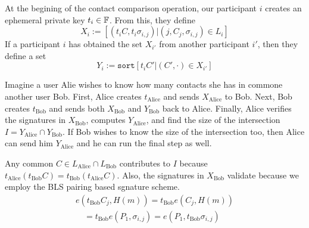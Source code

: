 \documentclass[twoside,letterpaper]{sig-alternate}
\def\mathperiod{.}
\def\mathperiod{}
\begin{document}
At the begining of the contact comparison operation,
our participant $i$ creates an ephemeral private key $t_i \in \mathbb{F}$.
From this, they define 
$$ X_i := %
  \left[ (t_i C, t_i \sigma_{i,j}) | (j,C_j,\sigma_{i,j}) \in L_i \right]
  \mathperiod $$ 
If a participant $i$ has obtained the set $X_{i'}$ from
 another participant $i'$, then they define a set 
$$ Y_i := \texttt{sort} \left[ t_i C' | (C',\cdot) \in X_{i'} \right]
  \mathperiod $$ 

Imagine a user Alie wishes to know how many contacts she has in commone
another user Bob.   
First, Alice creates $t_{\textrm{Alice}}$ and
 sends $X_{\textrm{Alice}}$ to Bob.
Next, Bob creates $t_{\textrm{Bob}}$ and
 sends both $X_{\textrm{Bob}}$ and $Y_{\textrm{Bob}}$ back to Alice.
Finally, Alice verifies the signatures in $X_{\textrm{Bob}}$,
 computes $Y_{\textrm{Alice}}$, and find the size of the intersection 
 $I = Y_{\textrm{Alice}} \cap Y_{\textrm{Bob}}$.
If Bob wishes to know the size of the intersection too, then Alice 
can send him $Y_{\textrm{Alice}}$ and he can run the final step as well.

Any common $C \in L_{\textrm{Alice}} \cap L_{\textrm{Bob}}$
 contributes to $I$ because
 $t_{\textrm{Alice}} (t_{\textrm{Bob}} C) = t_{\textrm{Bob}} (t_{\textrm{Alice}} C)$.
Also, the signatures in $X_{\textrm{Bob}}$ validate because 
we employ the BLS pairing based sgnature scheme. 
\begin{align*}
e( t_{\textrm{Bob}} C_j, H(m) )
 = t_{\textrm{Bob}} e( C_j, H(m) ) \\
 \quad = t_{\textrm{Bob}} e(P_1,\sigma_{i,j})
 = e(P_1,t_{\textrm{Bob}} \sigma_{i,j})
\end{align*}







\end{document}
